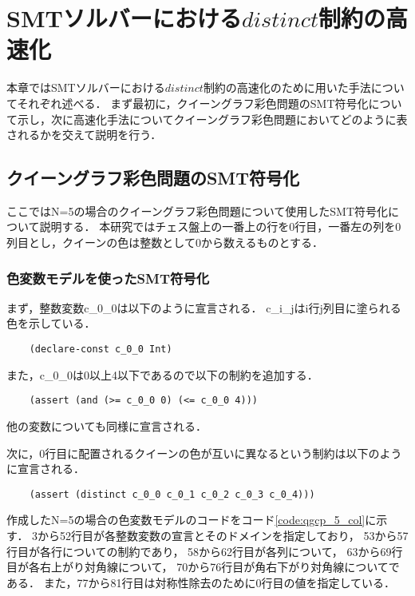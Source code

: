 \chapter{SMTソルバーにおける$distinct$制約の高速化}
本章ではSMTソルバーにおける$distinct$制約の高速化のために用いた手法についてそれぞれ述べる．
まず最初に，クイーングラフ彩色問題のSMT符号化について示し，次に高速化手法についてクイーングラフ彩色問題においてどのように表されるかを交えて説明を行う．

\section{クイーングラフ彩色問題のSMT符号化}
ここではN=5の場合のクイーングラフ彩色問題について使用したSMT符号化について説明する．
本研究ではチェス盤上の一番上の行を0行目，一番左の列を0列目とし，クイーンの色は整数として0から数えるものとする．

\subsection{色変数モデルを使ったSMT符号化}
まず，整数変数c\_0\_0は以下のように宣言される．
c\_i\_jはi行j列目に塗られる色を示している．
\begin{verbatim}
    (declare-const c_0_0 Int)
\end{verbatim}
また，c\_0\_0は0以上4以下であるので以下の制約を追加する．
\begin{verbatim}
    (assert (and (>= c_0_0 0) (<= c_0_0 4)))
\end{verbatim}
他の変数についても同様に宣言される．

次に，0行目に配置されるクイーンの色が互いに異なるという制約は以下のように宣言される．
\begin{verbatim}
    (assert (distinct c_0_0 c_0_1 c_0_2 c_0_3 c_0_4)))
\end{verbatim}

作成したN=5の場合の色変数モデルのコードをコード\ref{code:qgcp_5_col}に示す．
3から52行目が各整数変数の宣言とそのドメインを指定しており，
53から57行目が各行についての制約であり，
58から62行目が各列について，
63から69行目が各右上がり対角線について，
70から76行目が角右下がり対角線についてである．
また，77から81行目は対称性除去のために0行目の値を指定している．




